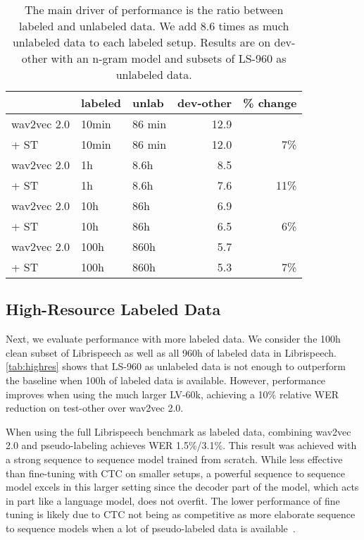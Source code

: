 \documentclass{article}
\newcommand{\wvpp}{wav2vec 2.0}
\newcommand{\libri}{Librispeech}
\newcommand{\voxsz}{LV-60k}
\newcommand{\librisz}{LS-960}
\begin{document}
\begin{table}[t]
\centering 
\caption{The main driver of performance is the ratio between labeled and unlabeled data. 
We add 8.6 times as much unlabeled data to each labeled setup. Results are on dev-other with an n-gram model and subsets of \librisz{} as unlabeled data.
}
\label{tab:ratio}
\begin{tabular}{lllrr}
\toprule
& labeled & unlab & dev-other & \% change \\
\midrule
\wvpp{} & 10min & 86 min & 12.9 \\
+ ST  & 10min & 86 min & 12.0 & 7\% \\
\midrule
\wvpp{} & 1h & 8.6h & 8.5 \\
+ ST  & 1h & 8.6h & 7.6 & 11\% \\
\midrule
\wvpp{} & 10h & 86h & 6.9 \\
+ ST  & 10h & 86h & 6.5 & 6\% \\
\midrule
\wvpp{} & 100h & 860h & 5.7 \\
+ ST  & 100h & 860h & 5.3 & 7\% \\
\bottomrule
\end{tabular}
\end{table}




\subsection{High-Resource Labeled Data}

Next, we evaluate performance with more labeled data.
We consider the 100h clean subset of \libri{} as well as all 960h of labeled data in \libri{}.
\autoref{tab:highres} shows that \librisz{} as unlabeled data is not enough to outperform the baseline when 100h of labeled data is available.
However, performance improves when using the much larger \voxsz{}, achieving a 10\% relative WER reduction on test-other over \wvpp{}.

When using the full Librispeech benchmark as labeled data, combining \wvpp{} and pseudo-labeling achieves WER 1.5\%/3.1\%.
This result was achieved with a strong sequence to sequence model trained from scratch. 
While less effective than fine-tuning with CTC on smaller setups, a powerful sequence to sequence model excels in this larger setting since the decoder part of the model, which acts in part like a language model, does not overfit.
The lower performance of fine tuning is likely due to CTC not being as competitive as more elaborate sequence to sequence models when a lot of pseudo-labeled data is available~\cite{synnaeve2019end}.
\end{document}
